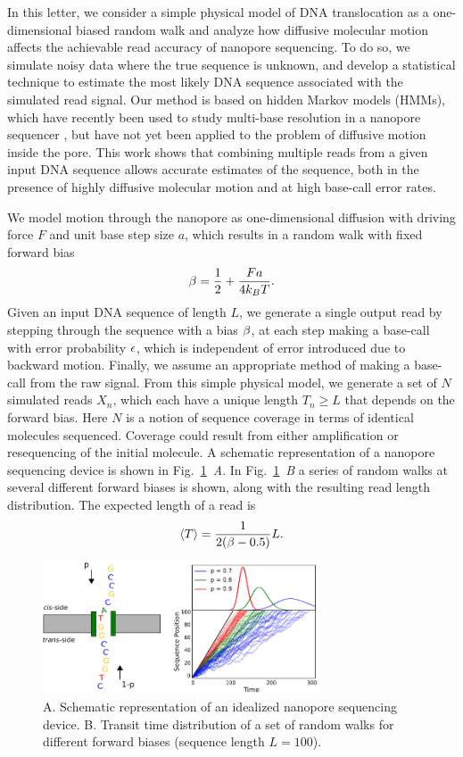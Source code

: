 \documentclass{biophys_letter}
\begin{document}
In this letter, we consider a simple physical model of DNA translocation as a one-dimensional biased random walk and analyze how diffusive molecular motion affects the achievable read accuracy of nanopore sequencing.
To do so, we simulate noisy data where the true sequence is unknown, and develop a statistical technique to estimate the most likely DNA sequence associated with the simulated read signal.
Our method is based on hidden Markov models (HMMs), which have recently been used to study multi-base resolution in a nanopore sequencer \cite{Timp:2012}, but have not yet been applied to the problem of diffusive motion inside the pore.
This work shows that combining multiple reads from a given input DNA sequence  allows accurate estimates of the sequence, both in the presence of highly diffusive molecular motion and at high base-call error rates.

We model motion through the nanopore as one-dimensional diffusion with driving force $F$ and unit base step size $a$, which results in a random walk with fixed forward bias \cite{Berg:1993}
\begin{equation}
\beta = \frac{1}{2} + \frac{Fa}{4k_{B}T}.
\end{equation}
Given an input DNA sequence of length $L$, we generate a single output read by stepping through the sequence with a bias $\beta$, at each step making a base-call with error probability $\epsilon$, which is independent of error introduced due to backward motion. 
Finally, we assume an appropriate method of making a base-call from the raw signal.
From this simple physical model, we generate a set of $N$ simulated reads $X_n$, which each have a unique length $T_{n} \ge L$ that depends on the forward bias.
Here $N$ is a notion of sequence coverage in terms of identical molecules sequenced.
Coverage could result from either amplification or resequencing of the initial molecule.
A schematic representation of a nanopore sequencing device is shown in Fig.~\ref{fig:fig1}\emph{~A}.
In Fig.~\ref{fig:fig1}\emph{~B} a series of random walks at several different forward biases is shown, along with the resulting read length distribution.
The expected length of a read is 
\begin{equation}
  \left\langle T  \right\rangle = \frac{1}{2(\beta-0.5)} L.
\end{equation}

\begin{figure}%
  \centering
  \includegraphics[width=3.25in]{fig/fig1-withcartoon-jw-eps2pdf-cropped.pdf}
  \caption{A. Schematic representation of an idealized nanopore sequencing device. B. Transit time distribution of a set of random walks for different forward biases (sequence length $L=100$).}
  \label{fig:fig1}
\end{figure}
\end{document}
